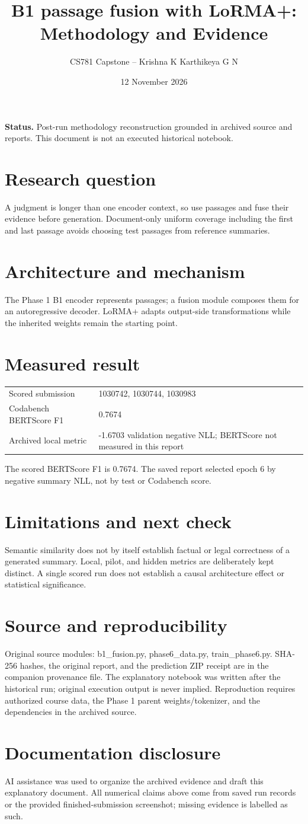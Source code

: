 \documentclass[11pt,a4paper]{article}
\title{B1 passage fusion with LoRMA+: Methodology and Evidence}
\author{CS781 Capstone -- Krishna K Karthikeya G N}
\date{12 November 2026}
\begin{document}
\maketitle
\noindent\textbf{Status.} Post-run methodology reconstruction grounded in archived source and reports. This document is not an executed historical notebook.\par
\section*{Research question}
A judgment is longer than one encoder context, so use passages and fuse their evidence before generation. Document-only uniform coverage including the first and last passage avoids choosing test passages from reference summaries.
\section*{Architecture and mechanism}
The Phase 1 B1 encoder represents passages; a fusion module composes them for an autoregressive decoder. LoRMA+ adapts output-side transformations while the inherited weights remain the starting point.
\section*{Measured result}
\begin{center}\begin{tabular}{ll}Scored submission & 1030742, 1030744, 1030983\\
Codabench BERTScore F1 & 0.7674\\
Archived local metric & -1.6703 validation negative NLL; BERTScore not measured in this report\end{tabular}\end{center}
The scored BERTScore F1 is 0.7674. The saved report selected epoch 6 by negative summary NLL, not by test or Codabench score.
\section*{Limitations and next check}
Semantic similarity does not by itself establish factual or legal correctness of a generated summary. Local, pilot, and hidden metrics are deliberately kept distinct. A single scored run does not establish a causal architecture effect or statistical significance.
\section*{Source and reproducibility}
Original source modules: b1\_fusion.py, phase6\_data.py, train\_phase6.py. SHA-256 hashes, the original report, and the prediction ZIP receipt are in the companion provenance file. The explanatory notebook was written after the historical run; original execution output is never implied. Reproduction requires authorized course data, the Phase 1 parent weights/tokenizer, and the dependencies in the archived source.
\section*{Documentation disclosure}
AI assistance was used to organize the archived evidence and draft this explanatory document. All numerical claims above come from saved run records or the provided finished-submission screenshot; missing evidence is labelled as such.
\end{document}
